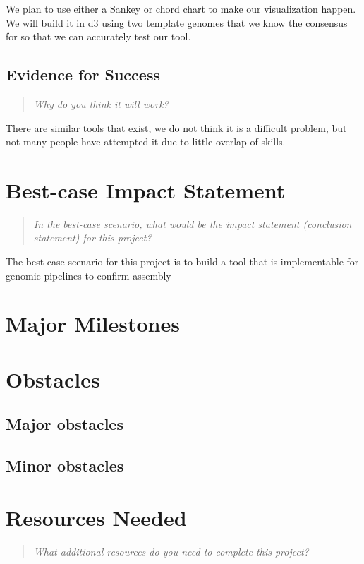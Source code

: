 \documentclass{proc}
\begin{document}
We plan to use either a Sankey or chord chart to make our visualization happen. We will build it in d3 using two template genomes that we know the consensus for so that we can accurately test our tool.

\subsection{Evidence for Success}
\begin{quote}
\textit{Why do you think it will work?} 
\end{quote}

There are similar tools that exist, we do not think it is a difficult problem, but not many people have attempted it due to little overlap of skills.

\section{Best-case Impact Statement}
\begin{quote}
\textit{In the best-case scenario, what would be the impact statement (conclusion statement) for this project? \cite{wijk2005value, pike2009science}}
\end{quote}

The best case scenario for this project is to build a tool that is implementable for genomic pipelines to confirm assembly

\section{Major Milestones}

\section{Obstacles}

\subsection{Major obstacles} %

\subsection{Minor obstacles}

\section{Resources Needed}
\begin{quote}
\textit{What additional resources do you need to complete this project?}
\end{quote}
\end{document}
